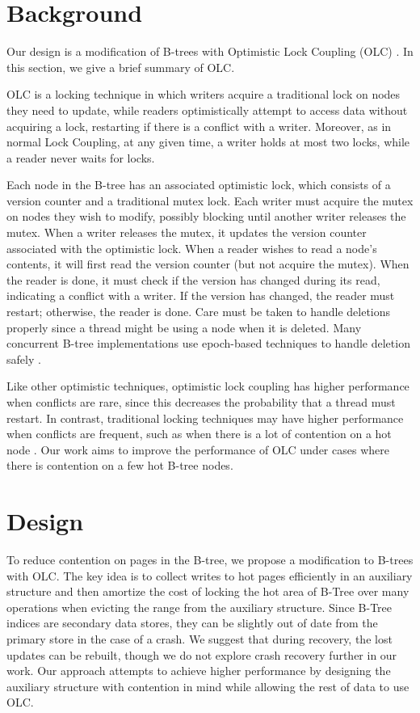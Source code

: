 \documentclass[twocolumn]{article}
\begin{document}
\section{Background}

Our design is a modification of B-trees with Optimistic Lock Coupling (OLC)
\cite{art}. In this section, we give a brief summary of OLC.

OLC is a locking technique in which writers acquire a traditional lock on nodes
they need to update, while readers optimistically attempt to access data
without acquiring a lock, restarting if there is a conflict with a writer.
Moreover, as in normal Lock Coupling, at any given time, a writer holds at most
two locks, while a reader never waits for locks.

Each node in the B-tree has an associated optimistic lock, which consists of a
version counter and a traditional mutex lock. Each writer must acquire the
mutex on nodes they wish to modify, possibly blocking until another writer
releases the mutex. When a writer releases the mutex, it updates the version
counter associated with the optimistic lock. When a reader wishes to read a
node’s contents, it will first read the version counter (but not acquire the
mutex). When the reader is done, it must check if the version has changed
during its read, indicating a conflict with a writer. If the version has
changed, the reader must restart; otherwise, the reader is done. Care must be
taken to handle deletions properly since a thread might be using a node when it
is deleted. Many concurrent B-tree implementations use epoch-based techniques
to handle deletion safely \cite{bwtree, art}.

Like other optimistic techniques, optimistic lock coupling has higher
performance when conflicts are rare, since this decreases the probability that
a thread must restart. In contrast, traditional locking techniques may have
higher performance when conflicts are frequent, such as when there is a lot of
contention on a hot node \cite{occ}. Our work aims to improve the performance of OLC
under cases where there is contention on a few hot B-tree nodes.

\section{Design}

To reduce contention on pages in the B-tree, we propose a modification to
B-trees with OLC. The key idea is to collect writes to hot pages efficiently in
an auxiliary structure and then amortize the cost of locking the hot area of
B-Tree over many operations when evicting the range from the auxiliary
structure. Since B-Tree indices are secondary data stores, they can be slightly
out of date from the primary store in the case of a crash. We suggest that
during recovery, the lost updates can be rebuilt, though we do not explore
crash recovery further in our work. Our approach attempts to achieve higher
performance by designing the auxiliary structure with contention in mind while
allowing the rest of data to use OLC.
\end{document}
